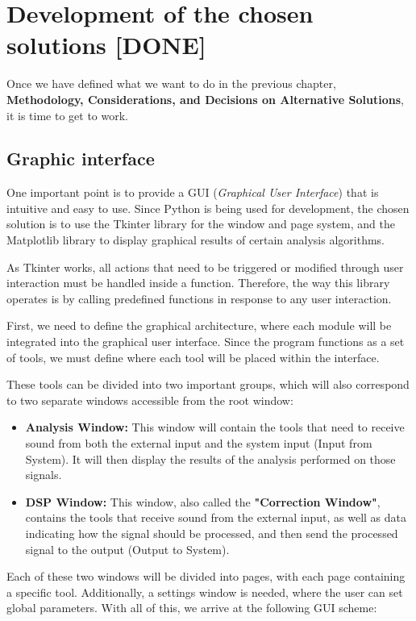 \chapter{Development of the chosen solutions [DONE]}

Once we have defined what we want to do in the previous chapter, \textbf{Methodology, Considerations, and Decisions on Alternative Solutions}, it is time to get to work.

\section{Graphic interface}

One important point is to provide a GUI (\textit{Graphical User Interface}) that is intuitive and easy to use. Since Python is being used for development, the chosen solution is to use the Tkinter\cite{Tkinter} library for the window and page system, and the Matplotlib\cite{Matplotlib} library to display graphical results of certain analysis algorithms.

As Tkinter works, all actions that need to be triggered or modified through user interaction must be handled inside a function. Therefore, the way this library operates is by calling predefined functions in response to any user interaction.

First, we need to define the graphical architecture, where each module will be integrated into the graphical user interface. Since the program functions as a set of tools, we must define where each tool will be placed within the interface.

These tools can be divided into two important groups, which will also correspond to two separate windows accessible from the root window:

\begin{itemize}
	\item \textbf{Analysis Window:} This window will contain the tools that need to receive sound from both the external input and the system input (Input from System). It will then display the results of the analysis performed on those signals.
	\item \textbf{DSP Window:} This window, also called the \textbf{"Correction Window"}, contains the tools that receive sound from the external input, as well as data indicating how the signal should be processed, and then send the processed signal to the output (Output to System).
\end{itemize}

Each of these two windows will be divided into pages, with each page containing a specific tool. Additionally, a settings window is needed, where the user can set global parameters. With all of this, we arrive at the following GUI scheme:

